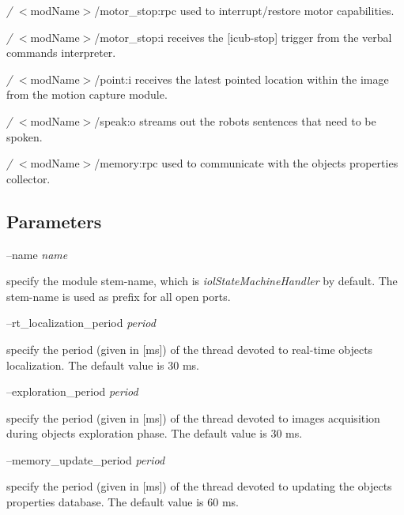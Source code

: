 \begin{DoxyItemize}
\item {\itshape /} $<$mod\+Name$>$/motor\+\_\+stop\+:rpc used to interrupt/restore motor capabilities.
\item {\itshape /} $<$mod\+Name$>$/motor\+\_\+stop\+:i receives the \mbox{[}icub-\/stop\mbox{]} trigger from the verbal commands interpreter.
\item {\itshape /} $<$mod\+Name$>$/point\+:i receives the latest pointed location within the image from the motion capture module.
\item {\itshape /} $<$mod\+Name$>$/speak\+:o streams out the robot\textquotesingle{}s sentences that need to be spoken.
\item {\itshape /} $<$mod\+Name$>$/memory\+:rpc used to communicate with the objects properties collector.
\end{DoxyItemize}\hypertarget{group__iolReachingCalibration_parameters_sec}{}\subsection{Parameters}\label{group__iolReachingCalibration_parameters_sec}
--name {\itshape name} 
\begin{DoxyItemize}
\item specify the module stem-\/name, which is {\itshape iol\+State\+Machine\+Handler} by default. The stem-\/name is used as prefix for all open ports.
\end{DoxyItemize}

--rt\+\_\+localization\+\_\+period {\itshape period} 
\begin{DoxyItemize}
\item specify the period (given in \mbox{[}ms\mbox{]}) of the thread devoted to real-\/time objects localization. The default value is 30 ms.
\end{DoxyItemize}

--exploration\+\_\+period {\itshape period} 
\begin{DoxyItemize}
\item specify the period (given in \mbox{[}ms\mbox{]}) of the thread devoted to images acquisition during objects exploration phase. The default value is 30 ms.
\end{DoxyItemize}

--memory\+\_\+update\+\_\+period {\itshape period} 
\begin{DoxyItemize}
\item specify the period (given in \mbox{[}ms\mbox{]}) of the thread devoted to updating the objects properties database. The default value is 60 ms.
\end{DoxyItemize}

